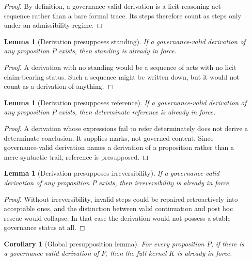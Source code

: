 \documentclass[11pt]{article}
\theoremstyle{plain}
\newtheorem{lemma}[theorem]{Lemma}
\newtheorem{corollary}[theorem]{Corollary}
\theoremstyle{definition}
\begin{document}
\begin{proof}
By definition, a governance-valid derivation is a licit reasoning act-sequence rather than a bare formal trace. Its steps therefore count as steps only under an admissibility regime.
\end{proof}

\begin{lemma}[Derivation presupposes standing]
\label{lem:A-der-stand}
If a governance-valid derivation of any proposition $P$ exists, then standing is already in force.
\end{lemma}

\begin{proof}
A derivation with no standing would be a sequence of acts with no licit claim-bearing status. Such a sequence might be written down, but it would not count as a derivation of anything.
\end{proof}

\begin{lemma}[Derivation presupposes reference]
\label{lem:A-der-ref}
If a governance-valid derivation of any proposition $P$ exists, then determinate reference is already in force.
\end{lemma}

\begin{proof}
A derivation whose expressions fail to refer determinately does not derive a determinate conclusion. It supplies marks, not governed content. Since governance-valid derivation names a derivation of a proposition rather than a mere syntactic trail, reference is presupposed.
\end{proof}

\begin{lemma}[Derivation presupposes irreversibility]
\label{lem:A-der-irr}
If a governance-valid derivation of any proposition $P$ exists, then irreversibility is already in force.
\end{lemma}

\begin{proof}
Without irreversibility, invalid steps could be repaired retroactively into acceptable ones, and the distinction between valid continuation and post hoc rescue would collapse. In that case the derivation would not possess a stable governance status at all.
\end{proof}

\begin{corollary}[Global presupposition lemma]
\label{cor:A-global-presupposition}
For every proposition $P$, if there is a governance-valid derivation of $P$, then the full kernel $K$ is already in force.
\end{corollary}
\end{document}
